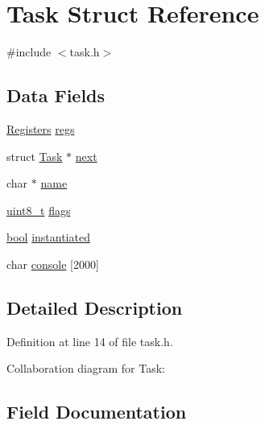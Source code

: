 \hypertarget{a00218}{}\section{Task Struct Reference}
\label{a00218}


{\ttfamily \#include $<$task.\+h$>$}

\subsection*{Data Fields}
\begin{DoxyCompactItemize}
\item 
\hyperlink{a00250}{Registers} \hyperlink{a00218_a136b243ee52ff89e9ba97f4e4dba19bb_a136b243ee52ff89e9ba97f4e4dba19bb}{regs}
\item 
struct \hyperlink{a00218}{Task} $\ast$ \hyperlink{a00218_a8b6b50960a19f7bae344ef0cc8ec4e7d_a8b6b50960a19f7bae344ef0cc8ec4e7d}{next}
\item 
char $\ast$ \hyperlink{a00218_a9cf84d1792cda878178fd3691e472b97_a9cf84d1792cda878178fd3691e472b97}{name}
\item 
\hyperlink{a00134_aba7bc1797add20fe3efdf37ced1182c5_aba7bc1797add20fe3efdf37ced1182c5}{uint8\+\_\+t} \hyperlink{a00218_a9f83f1da7a5a83aa9a5e4849b66db8c5_a9f83f1da7a5a83aa9a5e4849b66db8c5}{flags}
\item 
\hyperlink{a00134_af6a258d8f3ee5206d682d799316314b1_af6a258d8f3ee5206d682d799316314b1}{bool} \hyperlink{a00218_a781458d363296d44737fa13757fd6672_a781458d363296d44737fa13757fd6672}{instantiated}
\item 
char \hyperlink{a00218_a3076ad648de3a9c9c6c35bcd6a52ce4c_a3076ad648de3a9c9c6c35bcd6a52ce4c}{console} \mbox{[}2000\mbox{]}
\end{DoxyCompactItemize}


\subsection{Detailed Description}


Definition at line 14 of file task.\+h.



Collaboration diagram for Task\+:


\subsection{Field Documentation}
\mbox{\label{a00218_a3076ad648de3a9c9c6c35bcd6a52ce4c_a3076ad648de3a9c9c6c35bcd6a52ce4c}} 
